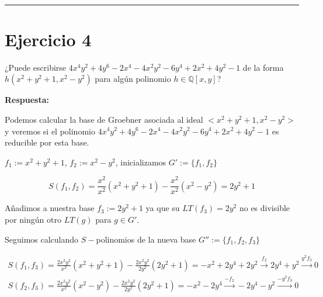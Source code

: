 \documentclass{article}
\begin{document}
    \begin{center}
    \end{center}
    { \hspace*{\fill} \\}
    
    \begin{center}\rule{3in}{0.4pt}\end{center}

    \section{Ejercicio 4}\label{ejercicio-4}

¿Puede escribirse
$4x^4y^2 + 4y^6 - 2x^4 - 4x^2y^2 - 6y^4 + 2x^2 + 4y^2 -1$ de la forma
$h(x^2 + y^2 + 1, x^2 - y^2)$ para algún polinomio
$h\in \mathbb{Q}[x,y]$? ~ ~

\bigskip

    \textbf{Respuesta:} ~
    
\bigskip

    Podemos calcular la base de Groebner asociada al ideal
$< x^2 + y^2 + 1, x^2-y^2 >$ y veremos si el polinomio
$4x^4y^2 + 4y^6 - 2x^4 -4x^2y^2 - 6y^4 + 2x^2 + 4y^2 - 1$ es reducible
por esta base. ~

    $f_1:=x^2+y^2+1$, $f_2:=x^2-y^2$, inicializamos $G':=\{f_1, f_2\}$

\begin{equation}
    S(f_1,f_2) = \frac{x^2}{x^2} (x^2+y^2+1) - \frac{x^2}{x^2} (x^2-y^2) = 2y^2+1
\end{equation}

Añadimos a nuestra base $f_3:=2y^2 + 1$ ya que su $LT(f_3) = 2y^2$ no es
divisible por ningún otro $LT(g)$ para $g\in G'$.

Seguimos calculando $S-$polinomios de la nueva base
$G'':=\{f_1, f_2, f_3\}$

\begin{equation}
    \begin{array}{l}
        S(f_1, f_3) = \frac{2x^2y^2}{x^2} (x^2+y^2+1) - \frac{2x^2y^2}{2y^2} (2y^2+1) = -x^2 + 2y^4 + 2y^2 \xrightarrow{f_2} 2y^4 + y^2 \xrightarrow{y^2 f_3} 0 \\
        S(f_2, f_3) = \frac{2x^2y^2}{x^2} (x^2-y^2) - \frac{2x^2y^2}{2y^2} (2y^2+1) = -x^2-2y^4 \xrightarrow{- f_2} -2y^4 - y^2 \xrightarrow{-y^2 f_3} 0
    \end{array}
\end{equation}
\end{document}
